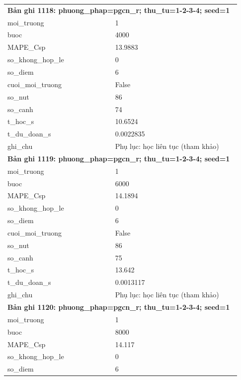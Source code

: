 \begin{longtable}{p{0.43\linewidth}p{0.50\linewidth}}
\midrule
\multicolumn{2}{p{0.95\linewidth}}{\textbf{Bản ghi 1118: phuong\_phap=pgcn\_r; thu\_tu=1-2-3-4; seed=1}} \\
moi\_\allowbreak truong & 1 \\
buoc & 4000 \\
MAPE\_\allowbreak Csp & 13.9883 \\
so\_\allowbreak khong\_\allowbreak hop\_\allowbreak le & 0 \\
so\_\allowbreak diem & 6 \\
cuoi\_\allowbreak moi\_\allowbreak truong & False \\
so\_\allowbreak nut & 86 \\
so\_\allowbreak canh & 74 \\
t\_\allowbreak hoc\_\allowbreak s & 10.6524 \\
t\_\allowbreak du\_\allowbreak doan\_\allowbreak s & 0.0022835 \\
ghi\_\allowbreak chu & Phụ lục: học liên tục (tham khảo) \\
\midrule
\multicolumn{2}{p{0.95\linewidth}}{\textbf{Bản ghi 1119: phuong\_phap=pgcn\_r; thu\_tu=1-2-3-4; seed=1}} \\
moi\_\allowbreak truong & 1 \\
buoc & 6000 \\
MAPE\_\allowbreak Csp & 14.1894 \\
so\_\allowbreak khong\_\allowbreak hop\_\allowbreak le & 0 \\
so\_\allowbreak diem & 6 \\
cuoi\_\allowbreak moi\_\allowbreak truong & False \\
so\_\allowbreak nut & 86 \\
so\_\allowbreak canh & 75 \\
t\_\allowbreak hoc\_\allowbreak s & 13.642 \\
t\_\allowbreak du\_\allowbreak doan\_\allowbreak s & 0.0013117 \\
ghi\_\allowbreak chu & Phụ lục: học liên tục (tham khảo) \\
\midrule
\multicolumn{2}{p{0.95\linewidth}}{\textbf{Bản ghi 1120: phuong\_phap=pgcn\_r; thu\_tu=1-2-3-4; seed=1}} \\
moi\_\allowbreak truong & 1 \\
buoc & 8000 \\
MAPE\_\allowbreak Csp & 14.117 \\
so\_\allowbreak khong\_\allowbreak hop\_\allowbreak le & 0 \\
so\_\allowbreak diem & 6 \\

\end{longtable}
